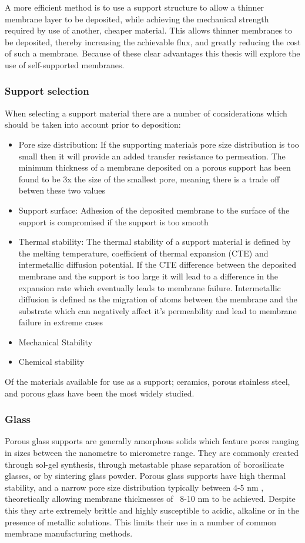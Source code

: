 A more efficient method is to use a support structure to allow a thinner membrane layer to 
be deposited, while achieving the mechanical strength required by use of another, cheaper 
material. This allows thinner membranes to be deposited, thereby increasing the achievable 
flux, and greatly reducing the cost of such a membrane.\cite{NathanW.Ockwig2007a} Because of these clear advantages 
this thesis will explore the use of self-supported membranes. 

\subsubsection{Support selection}
When selecting a support material there are a number of considerations which should be taken 
into account prior to deposition:
\begin{itemize}
\item Pore size distribution: If the supporting materials pore size distribution is too small then it will 
provide an added transfer resistance to permeation. The minimum thickness of a membrane deposited on a porous support has been found to be 3x the size of the smallest pore, \cite{Mardilovich2002} meaning there is a trade off betwen these two values
\item Support surface: Adhesion of the deposited membrane to the surface of the support is 
compromised if the support is too smooth
\item Thermal stability: The thermal stability of a support material is defined by the 
melting temperature, coefficient of thermal expansion (CTE) and intermetallic diffusion 
potential. If the CTE difference between the deposited membrane and the support is too large 
it will lead to a difference in the expansion rate which eventually leads to membrane failure. Intermetallic diffusion is defined as the migration of atoms between the membrane and the substrate which can negatively affect it’s permeability and lead to membrane failure in extreme cases
\item Mechanical Stability
\item Chemical stability
\end{itemize}
Of the materials available for use as a support; ceramics, porous stainless steel, and porous glass have been the most widely studied. 

\subsubsection*{Glass}
Porous glass supports are generally amorphous solids which feature pores ranging in sizes between the nanometre to micrometre range. They are commonly created through sol-gel synthesis, through metastable phase separation of borosilicate glasses, or by sintering glass powder. Porous glass supports have high thermal stability, and a narrow pore size distribution typically between 4-5 nm \cite{SCHLUNDER2006113} \cite{UEMIYA1991303}, theoretically allowing membrane thicknesses of ~8-10 nm to be achieved. \cite{Mardilovich2002} Despite this they arte extremely brittle and highly susceptible to acidic, alkaline or in the presence of metallic solutions. This limits their use in a number of common membrane manufacturing methods. 

